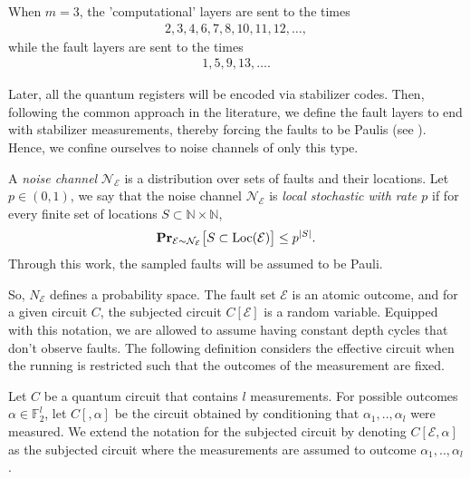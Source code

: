 \begin{example}
  When $m=3$, the 'computational' layers are sent to the times
  \begin{equation*}
    \begin{split}
      2,3,4,6,7,8,10,11,12,\ldots,
    \end{split}
  \end{equation*}
  while the fault layers are sent to the times
  \begin{equation*}
    \begin{split}
      1,5,9,13,\ldots.
    \end{split}
  \end{equation*}
\end{example}
Later, all the quantum registers will be encoded via stabilizer codes. Then, following the common approach in the literature, we define the fault layers to end with stabilizer measurements, thereby forcing the faults to be Paulis (see \cite{gottesman1997stabilizercodesquantumerror}). Hence, we confine ourselves to noise channels of only this type.
\begin{definition}
  \label{def:localstoc}
  A \textit{noise channel} $\mathcal{N}_{\mathcal{E}}$ is a distribution over sets of faults and their locations. Let $p\in(0,1)$, we say that the noise channel $\mathcal{N}_{\mathcal{E}}$ is \textit{local stochastic with rate $p$} if for every finite set of locations $S\subset \mathbb{N}\times \mathbb{N}$,
  \begin{equation*}
    \begin{split}
      \prbm{S\subset \operatorname{Loc}(\mathcal{E})}{\mathcal{E}\sim \mathcal{N}_{\mathcal{E}}}
      \le p^{|S|}.
    \end{split}
  \end{equation*}
Through this work, the sampled faults will be assumed to be Pauli.
\end{definition}
So, $N_{\mathcal{E}}$ defines a probability space. The fault set $\mathcal{E}$ is an atomic outcome, and for a given circuit $C$, the subjected circuit $C[\mathcal{E}]$ is a random variable. Equipped with this notation, we are allowed to assume having constant depth cycles that don't observe faults. The following definition considers the effective circuit when the running is restricted such that the outcomes of the measurement are fixed.

\begin{definition}
  Let $C$ be a quantum circuit that contains $l$ measurements. For possible outcomes $\alpha \in \mathbb{F}^{l}_{2}$, let $C[,\alpha]$ be the circuit obtained by conditioning that $\alpha_{1},..,\alpha_{l}$ were measured. We extend the notation for the subjected circuit by denoting $C[\mathcal{E},\alpha]$ as the subjected circuit where the measurements are assumed to outcome $\alpha_{1},..,\alpha_{l}$.
\end{definition}

